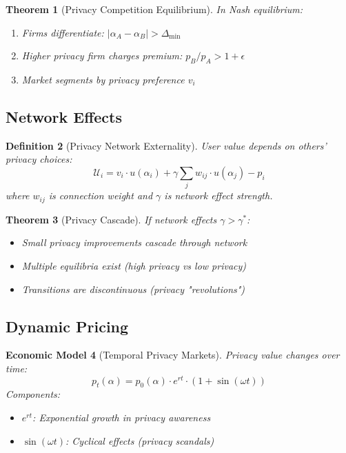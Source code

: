 \documentclass[11pt,final]{article}
\newcommand{\Utility}{\mathcal{U}}
\newtheorem{theorem}{Theorem}[section]
\newtheorem{definition}[theorem]{Definition}
\newtheorem{model}[theorem]{Economic Model}
\begin{document}
\begin{theorem}[Privacy Competition Equilibrium]
In Nash equilibrium:
\begin{enumerate}
    \item Firms differentiate: $|\alpha_A - \alpha_B| > \Delta_{\min}$
    \item Higher privacy firm charges premium: $p_B/p_A > 1 + \epsilon$
    \item Market segments by privacy preference $v_i$
\end{enumerate}
\end{theorem}

\subsection{Network Effects}

\begin{definition}[Privacy Network Externality]
User value depends on others' privacy choices:
\begin{equation}
\Utility_i = v_i \cdot u(\alpha_i) + \gamma \sum_j w_{ij} \cdot u(\alpha_j) - p_i
\end{equation}
where $w_{ij}$ is connection weight and $\gamma$ is network effect strength.
\end{definition}

\begin{theorem}[Privacy Cascade]
If network effects $\gamma > \gamma^*$:
\begin{itemize}
    \item Small privacy improvements cascade through network
    \item Multiple equilibria exist (high privacy vs low privacy)
    \item Transitions are discontinuous (privacy "revolutions")
\end{itemize}
\end{theorem}

\subsection{Dynamic Pricing}

\begin{model}[Temporal Privacy Markets]
Privacy value changes over time:
\begin{equation}
p_t(\alpha) = p_0(\alpha) \cdot e^{rt} \cdot (1 + \sin(\omega t))
\end{equation}
Components:
\begin{itemize}
    \item $e^{rt}$: Exponential growth in privacy awareness
    \item $\sin(\omega t)$: Cyclical effects (privacy scandals)
\end{itemize}
\end{model}
\end{document}

